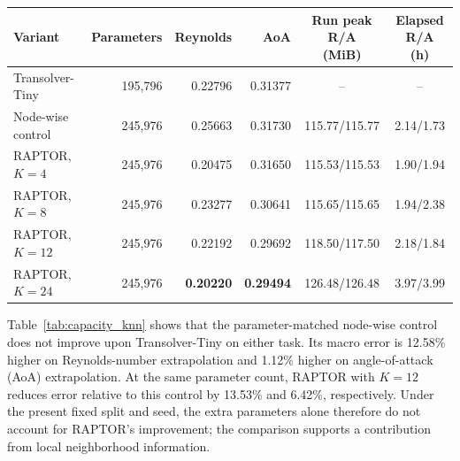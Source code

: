 \documentclass[a4paper,fleqn]{cas-sc}
\begin{document}
\begin{center}
	\begin{minipage}{\linewidth}
		\centering
		\label{tab:capacity_knn}
		\small
		\setlength{\tabcolsep}{4pt}
		\renewcommand{\arraystretch}{1.12}
		\begin{tabular}{lrrrcc}
			\toprule
			Variant & Parameters & Reynolds & AoA
			& \shortstack{Run peak R/A\\(MiB)}
			& \shortstack{Elapsed R/A\\(h)} \\
			\midrule
			Transolver-Tiny   & 195,796 & 0.22796 & 0.31377 & --            & -- \\
			Node-wise control & 245,976 & 0.25663 & 0.31730 & 115.77/115.77 & 2.14/1.73 \\
			RAPTOR, $K=4$     & 245,976 & 0.20475 & 0.31650 & 115.53/115.53 & 1.90/1.94 \\
			RAPTOR, $K=8$     & 245,976 & 0.23277 & 0.30641 & 115.65/115.65 & 1.94/2.38 \\
			RAPTOR, $K=12$    & 245,976 & 0.22192 & 0.29692 & 118.50/117.50 & 2.18/1.84 \\
			RAPTOR, $K=24$    & 245,976 & \textbf{0.20220}
			& \textbf{0.29494} & 126.48/126.48 & 3.97/3.99 \\
			\bottomrule
		\end{tabular}
	\end{minipage}
\end{center}

Table~\ref{tab:capacity_knn} shows that the parameter-matched node-wise
control does not improve upon Transolver-Tiny on either task. Its macro
error is 12.58\% higher on Reynolds-number extrapolation and 1.12\%
higher on angle-of-attack (AoA) extrapolation. At the same parameter
count, RAPTOR with $K=12$ reduces error relative to this control by
13.53\% and 6.42\%, respectively. Under the present fixed split and
seed, the extra parameters alone therefore do not account for RAPTOR's
improvement; the comparison supports a contribution from local
neighborhood information.
\end{document}

